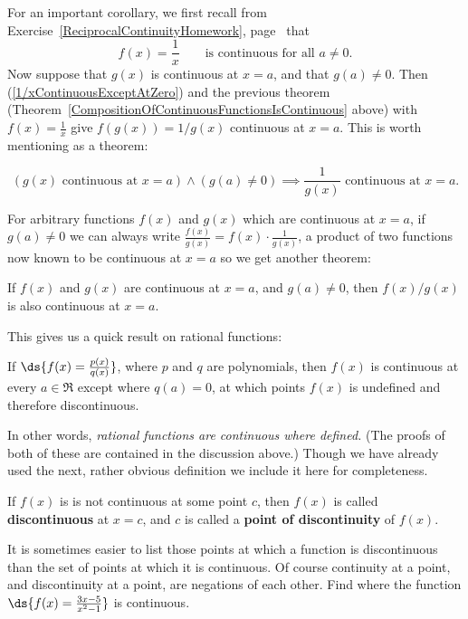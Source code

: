 For an important corollary, we first recall from 
Exercise~\ref{ReciprocalContinuityHomework}, 
page~\pageref{ReciprocalContinuityHomework} that
\begin{equation}
f(x)=\frac1{x}\qquad\text{is continuous for all }a\ne0.
\label{1/xContinuousExceptAtZero}\end{equation}
Now suppose that $g(x)$ is continuous at $x=a$, and
that $g(a)\ne0$.  Then (\ref{1/xContinuousExceptAtZero})
and the previous theorem
(Theorem~\ref{CompositionOfContinuousFunctionsIsContinuous} above)
with $f(x)=\frac1x$
give $f(g(x))=1/g(x)$ continuous at $x=a$. This is worth 
mentioning as a theorem:
\begin{theorem}
\begin{equation}
(g(x)\text{ continuous at }x=a)\wedge
(g(a)\ne 0)\implies\frac{1}{g(x)}\text{ continuous at }x=a.
\end{equation}
\end{theorem}
For arbitrary functions $f(x)$ and $g(x)$ which are continuous at
$x=a$, if $g(a)\ne 0$ we can 
always write ${\frac{f(x)}{g(x)}=f(x)\cdot\frac1{g(x)}}$, 
a product of two functions now known to be  continuous
at $x=a$ so we get another theorem:
\begin{theorem}
If $f(x)$ and $g(x)$ are continuous at $x=a$, and
$g(a)\ne 0$, then $f(x)/g(x)$ is also continuous at $x=a$.
\end{theorem}
This gives us a quick result on rational functions:
\begin{theorem}
If $\ds{f(x)=\frac{p(x)}{q(x)}}$, where $p$ and $q$ are
polynomials, then $f(x)$ is continuous at every
$a\in\Re$  except where $q(a)=0$,
at which points $f(x)$ is undefined and therefore
discontinuous.\end{theorem}
In other words, {\it rational functions are continuous where defined. }
(The proofs of both of these are contained in the discussion above.)
Though we have already used the next,  rather obvious
definition we include it here for completeness.

\begin{definition}If $f(x)$ is is not continuous at some point
$c$, then $f(x)$ is called {\bf discontinuous} at $x=c$, and
$c$ is called a {\bf point of discontinuity} of $f(x)$.
\end{definition}

It is sometimes easier to list those points at which a function is 
discontinuous  than the set of points at which it
is continuous.  Of course continuity at a point, and
discontinuity at a point, are negations of each other.
\bex Find where the function $\ds{f(x)=\frac{3x-5}{x^2-1}}$
is continuous.

